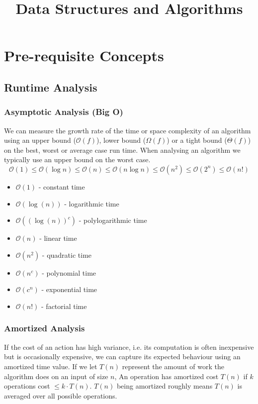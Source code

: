 \documentclass{article}
\title{\vspace{-3cm} Data Structures and Algorithms}
\date{}
\newcommand{\bigO}{\mathcal{O}}
\begin{document}
\maketitle
\vspace{-1.5cm}
\tableofcontents
\newpage

\section{Pre-requisite Concepts}

    \subsection{Runtime Analysis}
    \subsubsection{Asymptotic Analysis (Big O)}
    We can measure the growth rate of the time or space complexity of an algorithm using an upper bound ($\bigO(f)$), lower bound ($\Omega (f) $) or a tight bound ($\Theta (f)$) on the best, worst or average case run time. When analysing an algorithm we typically use an upper bound on the worst case. 
    \[
        \bigO(1) \leq \bigO(\log n) \leq \bigO(n) \leq \bigO(n \log n) \leq \bigO(n^2) \leq  \bigO(2^n)  \leq \bigO(n!)
    \]
    \begin{multicols}{2}
    \begin{itemize}
        \item[] $\bigO(1)$ - constant time
        \item[] $\bigO(\log(n))$ - logarithmic time
        \item[] $\bigO((\log(n))^c)$ - polylogarithmic time
        \item[] $\bigO(n)$ - linear time
        \item[] $\bigO(n^2)$ - quadratic time
        \item[] $\bigO(n^c)$ - polynomial time
        \item[] $\bigO(c^n)$ - exponential time
        \item[] $\bigO(n!)$ - factorial time
    \end{itemize}
    \end{multicols}
    
    \subsubsection{Amortized Analysis}
    If the cost of an action has high variance, i.e. its computation is often inexpensive but is occasionally expensive, we can capture its expected behaviour using an amortized time value. If we let $T(n)$ represent the amount of work the algorithm does on an input of size $n$, An operation has amortized cost $T(n)$ if $k$ operations cost $\leq k \cdot T(n)$. $T(n)$ being amortized roughly means $T(n)$ is averaged over all possible operations. 
    
\end{document}
